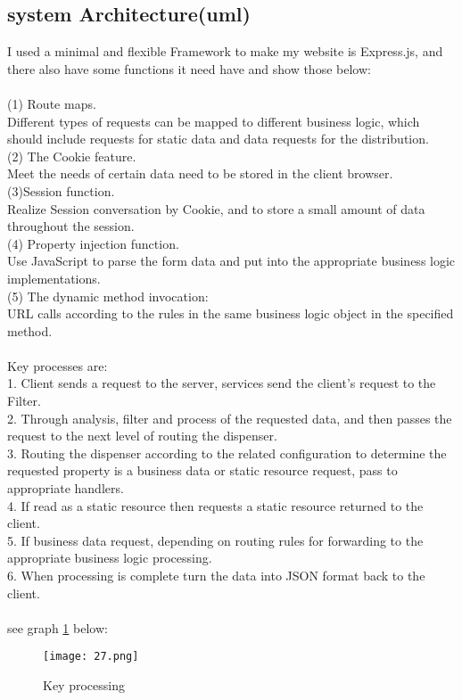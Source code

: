 \subsection{system Architecture(uml)} 
I used a minimal and flexible Framework to make my website is Express.js, and there also have some functions it need have and show those below:\\
\\
(1) Route maps.\\
Different types of requests can be mapped to different business logic, which should include requests for static data and data requests for the distribution.\\
(2) The Cookie feature.\\
 Meet the needs of certain data need to be stored in the client browser.\\
(3)Session function.\\
Realize Session conversation by Cookie, and to store a small amount of data throughout the session.\\
(4) Property injection function. \\
Use JavaScript to parse the form data and put into the appropriate business logic implementations.\\
(5) The dynamic method invocation:\\
 URL calls according to the rules in the same business logic object in the specified method.\\
\\
Key processes are:\\
1.	Client sends a request to the server, services send the client’s request to the Filter.\\ 
2.	Through analysis, filter and process of the requested data, and then passes the request to the next level of routing the dispenser.\\
3.	 Routing the dispenser according to the related configuration to determine the requested property is a business data or static resource request, pass to appropriate handlers.\\
4.	 If read as a static resource then requests a static resource returned to the client.\\ 
5.	If business data request, depending on routing rules for forwarding to the appropriate business logic processing.\\
6.	 When processing is complete turn the data into JSON format back to the client.\\
\\
see graph \ref{fig:2 cubed graph} below:
\begin{figure}[h]
	\centering
	\texttt{[image: 27.png]}
	\caption{Key processing}
	\label{fig:2 cubed graph}
\end{figure}
\\
